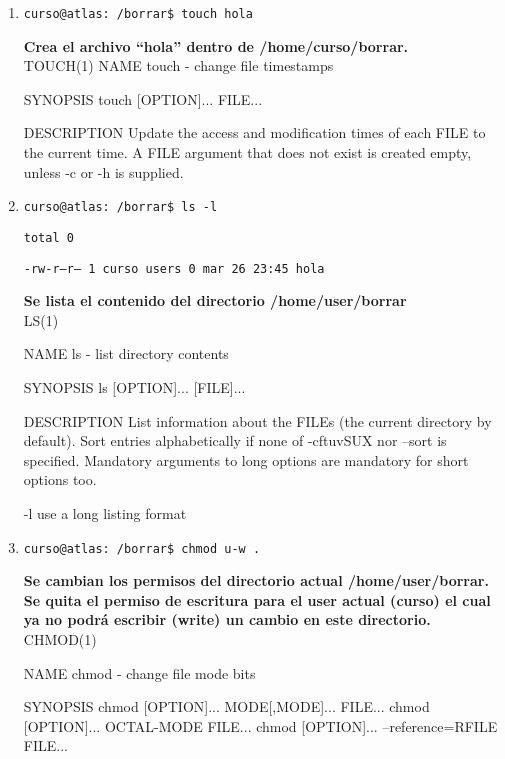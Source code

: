 \documentclass[a4paper,11pt,spanish]{article} %
\begin{document}
\begin{enumerate}
 \item \texttt{curso@atlas:~/borrar\$ touch hola}
 
 \textbf{Crea el archivo ``hola'' dentro de /home/curso/borrar.}\\

TOUCH(1)                                                                   
NAME
       touch - change file timestamps
       
SYNOPSIS
       touch [OPTION]... FILE...
       
DESCRIPTION
       Update the access and modification times of each FILE to the current time.
       A FILE argument that does not exist is created empty, unless -c or -h is supplied.\\
       
 \item \texttt{curso@atlas:~/borrar\$ ls -l}

\texttt{total 0}

\texttt{-rw-r--r-- 1 curso users 0 mar 26 23:45 hola}

\textbf{Se lista el contenido del directorio /home/user/borrar}\\

LS(1)                                                                      

NAME
       ls - list directory contents

SYNOPSIS
       ls [OPTION]... [FILE]...

DESCRIPTION
       List information about the FILEs (the current directory by default).  
       Sort entries alphabetically if none of -cftuvSUX nor --sort is specified.
       Mandatory arguments to long options are mandatory for short options too.
       
       -l     use a long listing format
       
 
 \item \texttt{curso@atlas:~/borrar\$ chmod u-w .}
 
 \textbf{Se cambian los permisos del directorio actual /home/user/borrar. 
 Se quita el permiso de escritura para el user actual (curso) el cual ya no 
 podrá escribir (write) un cambio en este directorio.}\\
 
CHMOD(1)                                                                

NAME
       chmod - change file mode bits

SYNOPSIS
       chmod [OPTION]... MODE[,MODE]... FILE...
       chmod [OPTION]... OCTAL-MODE FILE...
       chmod [OPTION]... --reference=RFILE FILE...


\end{enumerate}
\end{document}
